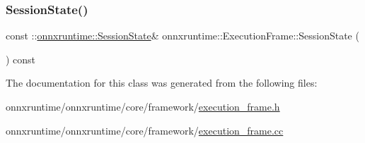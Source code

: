 \mbox{\label{classonnxruntime_1_1ExecutionFrame_ad8c2bf7d42371d918c46390637fa7169}} 
\subsubsection{\texorpdfstring{Session\+State()}{SessionState()}}
{\footnotesize\ttfamily const \+::\mbox{\hyperlink{classonnxruntime_1_1SessionState}{onnxruntime\+::\+Session\+State}}\& onnxruntime\+::\+Execution\+Frame\+::\+Session\+State (\begin{DoxyParamCaption}{ }\end{DoxyParamCaption}) const\hspace{0.3cm}{\ttfamily [inline]}}



The documentation for this class was generated from the following files\+:\begin{DoxyCompactItemize}
\item 
onnxruntime/onnxruntime/core/framework/\mbox{\hyperlink{execution__frame_8h}{execution\+\_\+frame.\+h}}\item 
onnxruntime/onnxruntime/core/framework/\mbox{\hyperlink{execution__frame_8cc}{execution\+\_\+frame.\+cc}}\end{DoxyCompactItemize}
